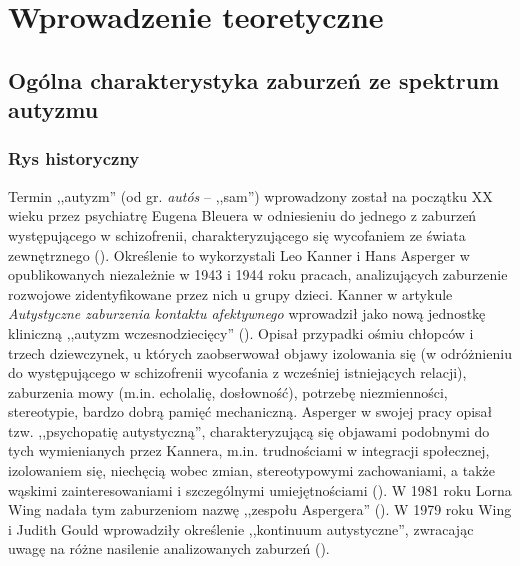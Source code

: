 \chapter{Wprowadzenie teoretyczne}
\thispagestyle{firststyle}

\section{Ogólna charakterystyka zaburzeń ze spektrum autyzmu}

    \subsection{Rys historyczny}
    Termin ,,autyzm'' (od gr. \emph{autós} -- ,,sam'') wprowadzony został na początku XX wieku przez psychiatrę Eugena Bleuera w odniesieniu do jednego z zaburzeń występującego w schizofrenii, charakteryzującego się wycofaniem ze świata zewnętrznego (\cite{frith2008autyzm}).
    Określenie to wykorzystali Leo Kanner i Hans Asperger w opublikowanych niezależnie w 1943 i 1944 roku pracach, analizujących zaburzenie rozwojowe zidentyfikowane przez nich u grupy dzieci.
    Kanner w artykule \emph{Autystyczne zaburzenia kontaktu afektywnego} wprowadził jako nową jednostkę kliniczną ,,autyzm wczesnodziecięcy'' (\cite{kanner1943autistic}).
    Opisał przypadki ośmiu chłopców i trzech dziewczynek, u których zaobserwował objawy izolowania się (w odróżnieniu do występującego w schizofrenii wycofania z wcześniej istniejących relacji), zaburzenia mowy (m.in. echolalię, dosłowność), potrzebę niezmienności, stereotypie, bardzo dobrą pamięć mechaniczną.
    Asperger w swojej pracy opisał tzw. ,,psychopatię autystyczną'', charakteryzującą się objawami podobnymi do tych wymienianych przez Kannera, m.in. trudnościami w integracji społecznej, izolowaniem się, niechęcią wobec zmian, stereotypowymi zachowaniami, a także wąskimi zainteresowaniami i szczególnymi umiejętnościami (\cite{asperger1991autistic}).
    W 1981 roku Lorna Wing nadała tym zaburzeniom nazwę ,,zespołu Aspergera'' (\cite{wing1981asperger}).
    W 1979 roku Wing i Judith Gould wprowadziły określenie ,,kontinuum autystyczne'', zwracając uwagę na różne nasilenie analizowanych zaburzeń (\cite{wing1979severe}).
    
    
